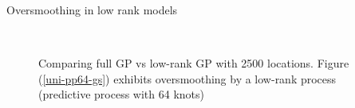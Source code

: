 \begin{frame}{Oversmoothing in low rank models}
 
\begin{figure}[t]
\begin{center}
\\
\end{center}
\caption{Comparing full GP vs low-rank GP with 2500 locations. Figure (\ref{uni-pp64-gs}) exhibits oversmoothing by a low-rank process (predictive process with 64 knots)} %
\end{figure}
 
\end{frame}



